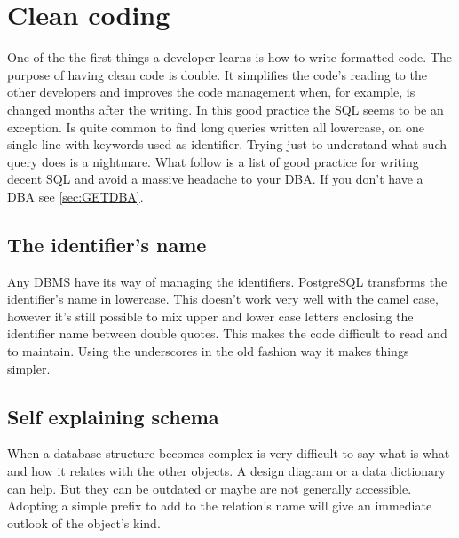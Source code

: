 \section{Clean coding}
One of the the first things a developer learns is how to write formatted code. The purpose of 
having clean code is double. It simplifies the code's reading to the other developers and 
improves the code management when, for example, is changed months after the writing. In this good 
practice the SQL seems to be an exception. Is quite common to find long queries written all 
lowercase, on one single line with keywords used as identifier. Trying just to understand what such 
query does is a nightmare. What follow is a list of good practice for writing decent SQL and avoid 
a massive headache to your DBA. If you don't have a DBA see \ref{sec:GETDBA}.

\subsection{The identifier's name}
Any DBMS have its way of managing the identifiers. PostgreSQL transforms the identifier's name in  
lowercase. This doesn't work very well with the camel case, however it's still possible to mix
upper and lower case letters enclosing the identifier name between double quotes. This makes the
code difficult to read and to maintain. Using the underscores in the old fashion way it makes
things simpler.

\subsection{Self explaining schema}
When a database structure becomes complex is very difficult to say what is what and how 
it relates with the other objects. A design diagram or a data dictionary can help. But they can be 
outdated or maybe are not generally accessible. Adopting a simple prefix to add to the relation's
name will give an immediate outlook of the object's kind.\newline

